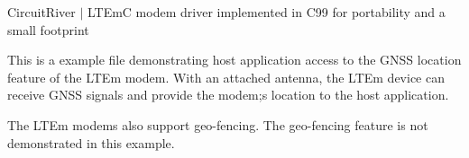 Circuit\+River $\vert$ LTEmC modem driver implemented in C99 for portability and a small footprint

This is a example file demonstrating host application access to the GNSS location feature of the LTEm modem. With an attached antenna, the LTEm device can receive GNSS signals and provide the modem;s location to the host application.

The LTEm modems also support geo-\/fencing. The geo-\/fencing feature is not demonstrated in this example. 